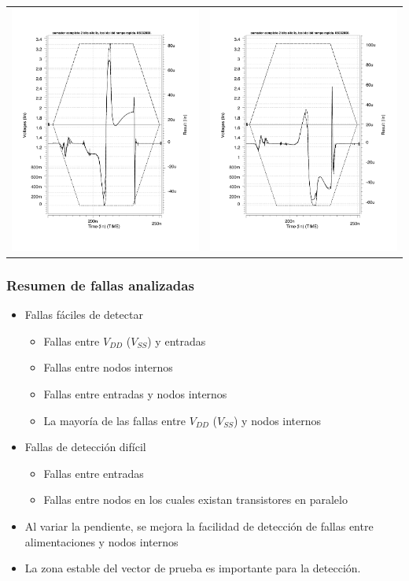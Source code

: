 \documentclass[
paper=128mm:96mm, %
fontsize=11pt, %
pagesize, %
parskip=half-, %
]{scrartcl} %
\theoremstyle{mythmstyle} %
\begin{document}
\begin{table}[ht]
  \centering
  \begin{tabular}{cc}
    \includegraphics[width=0.32\linewidth]{rr50-4}&\includegraphics[width=0.32\linewidth]{rr60-6}\\
  \end{tabular}
  \label{tab:results}
\end{table}

\clearpage

\subsubsection{Resumen de fallas analizadas}
\label{sec:faultResume}

\begin{multicols}{2} %
\begin{itemize}
\item Fallas fáciles de detectar
  \begin{itemize}
  \item Fallas entre $V_{DD}$ ($V_{SS}$) y entradas
  \item Fallas entre nodos internos
  \item Fallas entre entradas y nodos internos
  \item La mayoría de las fallas entre $V_{DD}$ ($V_{SS}$) y nodos
    internos
  \end{itemize}
\item Fallas de detección difícil
  \begin{itemize}
  \item Fallas entre entradas
  \item Fallas entre nodos en los cuales existan transistores en
    paralelo
  \end{itemize}
\item Al variar la pendiente, se mejora la facilidad de detección de
fa\-llas entre alimentaciones y nodos internos
\item La zona estable del vector de prueba es importante para la detección.
\end{itemize}
\end{multicols}
\end{document}
